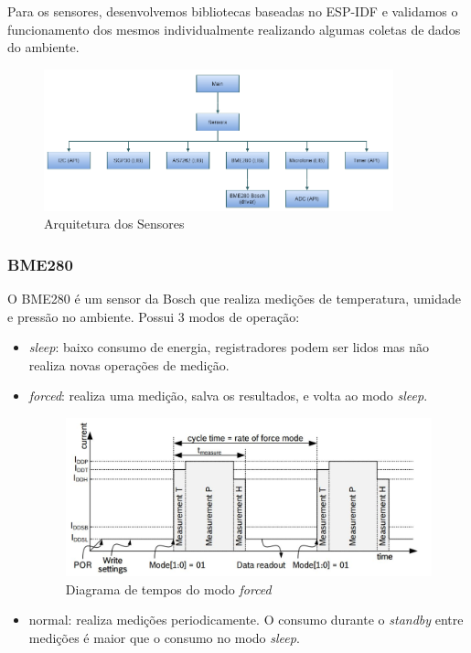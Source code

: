 \documentclass[../monografia.tex]{subfiles}
\begin{document}
Para os sensores, desenvolvemos bibliotecas baseadas no ESP-IDF e validamos o funcionamento dos mesmos individualmente realizando algumas coletas de dados do ambiente. 

\begin{figure}[h]
	\centering
	\includegraphics[width=0.9\textwidth]{sensors-arch}
	\caption{Arquitetura dos Sensores}
	\label{fig:sensors-arch}
\end{figure}

\subsubsection{BME280}

O BME280 é um sensor da Bosch que realiza medições de temperatura, umidade e pressão no ambiente. Possui 3 modos de operação: \cite{bme280}
\begin{itemize}
	\item \textit{sleep}: baixo consumo de energia, registradores podem ser lidos mas não realiza novas operações de medição.
	\item \textit{forced}: realiza uma medição, salva os resultados, e volta ao modo \textit{sleep}.
	
	\begin{figure}[h]
		\centering
		\includegraphics[width=12cm]{timing_bme280}
		\caption{Diagrama de tempos do modo \textit{forced}}
		\label{fig:time_bme280}
	\end{figure}

	\item normal: realiza medições periodicamente. O consumo durante o \textit{standby} entre medições é maior que o consumo no modo \textit{sleep}. 
\end{itemize}
\end{document}
